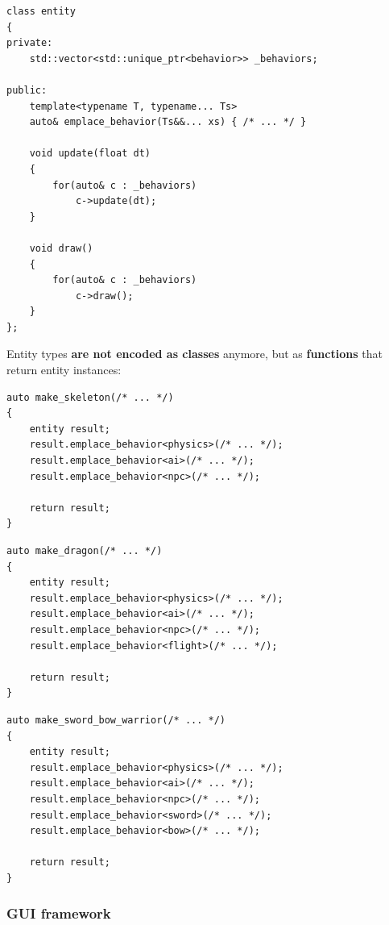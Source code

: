 \documentclass[oneside, 12pt, a4paper, openany]{book}
\begin{document}
\begin{verbatim}
class entity
{
private:
    std::vector<std::unique_ptr<behavior>> _behaviors;

public:
    template<typename T, typename... Ts>
    auto& emplace_behavior(Ts&&... xs) { /* ... */ }

    void update(float dt)
    {
        for(auto& c : _behaviors)
            c->update(dt);
    }

    void draw()
    {
        for(auto& c : _behaviors)
            c->draw();
    }
};
\end{verbatim}

Entity types \textbf{are not encoded as classes} anymore, but as
\textbf{functions} that return entity instances:

\begin{verbatim}
auto make_skeleton(/* ... */)
{
    entity result;
    result.emplace_behavior<physics>(/* ... */);
    result.emplace_behavior<ai>(/* ... */);
    result.emplace_behavior<npc>(/* ... */);

    return result;
}
\end{verbatim}

\begin{verbatim}
auto make_dragon(/* ... */)
{
    entity result;
    result.emplace_behavior<physics>(/* ... */);
    result.emplace_behavior<ai>(/* ... */);
    result.emplace_behavior<npc>(/* ... */);
    result.emplace_behavior<flight>(/* ... */);

    return result;
}
\end{verbatim}

\begin{verbatim}
auto make_sword_bow_warrior(/* ... */)
{
    entity result;
    result.emplace_behavior<physics>(/* ... */);
    result.emplace_behavior<ai>(/* ... */);
    result.emplace_behavior<npc>(/* ... */);
    result.emplace_behavior<sword>(/* ... */);
    result.emplace_behavior<bow>(/* ... */);

    return result;
}
\end{verbatim}

\subsubsection{GUI framework}\label{gui-framework-2}
\end{document}
